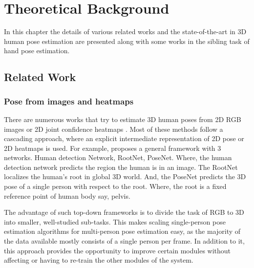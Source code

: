 \chapter{Theoretical Background}
\label{chap:background}


In this chapter the details of various related works and the state-of-the-art in 3D human pose estimation are presented along with some works in the sibling task of hand pose estimation. 





\section{Related Work}
\label{sec:relatedwork}

\subsection{Pose from images and heatmaps}
There are numerous works that try to estimate 3D human poses from 2D \ac{RGB} images or 2D joint confidence heatmaps \cite{CameraDistanceAware, poselifter, DistillNRSfM, occlusionVideo}. Most of these methods follow a cascading approach, where an explicit intermediate representation of 2D pose or 2D heatmaps is used. For example, \cite{CameraDistanceAware} proposes a general framework with 3 networks. Human detection Network, RootNet, PoseNet. Where, the human detection network predicts the region the human is in an image. The RootNet localizes the human's root in global 3D world. And, the PoseNet predicts the 3D pose of a single person with respect to the root. Where, the root is a fixed reference point of human body say, pelvis. 

The advantage of such top-down frameworks is to divide the task of RGB to 3D into smaller, well-studied sub-tasks. This makes scaling single-person pose estimation algorithms for multi-person pose estimation easy, as the majority of the data available mostly consists of a single person per frame. In addition to it, this approach provides the opportunity to improve certain modules without affecting or having to re-train the other modules of the system.  

